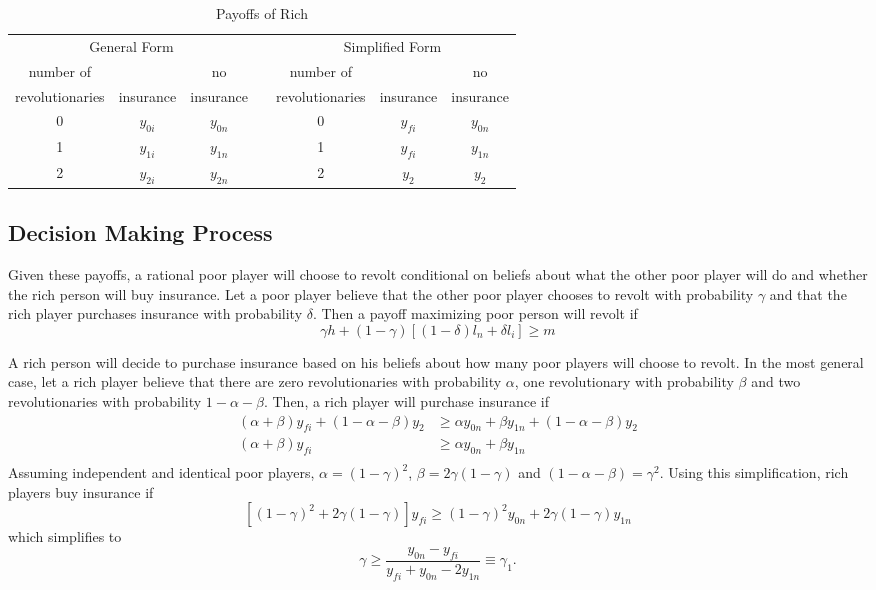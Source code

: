 \documentclass[12pt]{article}
\begin{document}
	\begin{table}[!htbp]
		\caption{Payoffs of Rich}
		\label{rpayoffs}
		\centering
		\begin{tabular}{|c||c|c|c|c||c|c|}
			\multicolumn{3}{c}{General Form} &
			\multicolumn{1}{c}{} &
			\multicolumn{3}{c}{Simplified Form}\\
			\cline{1-3}\cline{5-7}
			number of & & no & & number of & & no\\
			revolutionaries & insurance & insurance && revolutionaries & 
			insurance & insurance\\
			\cline{1-3}\cline{5-7}
			0 & $y_{0i}$ & $y_{0n}$ && 0 & $y_{fi}$ & $y_{0n}$\\
			\cline{1-3}\cline{5-7}
			1 & $y_{1i}$ & $y_{1n}$ && 1 & $y_{fi}$ & $y_{1n}$\\
			\cline{1-3}\cline{5-7}
			2 & $y_{2i}$ & $y_{2n}$ && 2 & $y_2$ & $y_2$\\
			\cline{1-3}\cline{5-7}
		\end{tabular}
	\end{table}
	
	\subsection{Decision Making Process}
	Given these payoffs, a rational poor player will choose to revolt 
	conditional on beliefs about what the other poor player will do and whether 
	the rich person will buy insurance. Let a poor player believe that the 
	other poor player chooses to revolt with probability $\gamma$ and that the 
	rich player purchases insurance with probability $\delta$. Then a payoff 
	maximizing poor person will revolt if
	$$\gamma h + (1-\gamma)\left[ (1-\delta)l_n + \delta l_i \right] \geq m $$
	
	A rich person will decide to purchase insurance based on his beliefs about 
	how many poor players will choose to revolt. In the most general case, let 
	a rich player believe that there are zero revolutionaries with probability 
	$\alpha$, one revolutionary with probability $\beta$ and two 
	revolutionaries with probability $1-\alpha-\beta$. Then, a rich player will 
	purchase insurance if
	\begin{align*}
		(\alpha+\beta)y_{fi} + (1-\alpha-\beta)y_2 &\geq \alpha y_{0n} + \beta 
		y_{1n} + (1-\alpha-\beta)y_2\\
		(\alpha+\beta)y_{fi} &\geq \alpha y_{0n} + \beta y_{1n}\\
	\end{align*}
	Assuming independent and identical poor players, $\alpha=(1-\gamma)^2$, 
	$\beta=2\gamma(1-\gamma)$ and $(1-\alpha-\beta)=\gamma^2$. Using this 
	simplification, rich players buy insurance if
	$$ \left[(1-\gamma)^2 + 2\gamma(1-\gamma)\right]y_{fi} \geq 
	(1-\gamma)^2y_{0n} + 2\gamma(1-\gamma)y_{1n} $$
	which simplifies to
	\begin{equation}\tag{I}
		\label{I}
		\gamma \geq \frac{y_{0n} - y_{fi}}{y_{fi} + y_{0n} -2y_{1n}} \equiv 
		\gamma_1.
	\end{equation}
	
\end{document}
